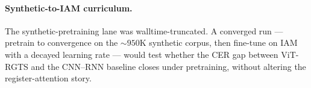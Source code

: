 \documentclass[10pt,a4paper]{article}
\begin{document}
\paragraph{Synthetic-to-IAM curriculum.} The synthetic-pretraining lane was walltime-truncated. A converged run --- pretrain to convergence on the ${\sim}950$K synthetic corpus, then fine-tune on IAM with a decayed learning rate --- would test whether the CER gap between ViT-RGTS and the CNN--RNN baseline closes under pretraining, without altering the register-attention story.



\end{document}
